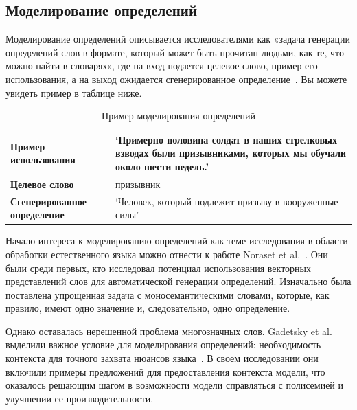 \documentclass[LI,VKR]{HSEUniversity}
\begin{document}
\subsection{Моделирование определений}

Моделирование определений описывается исследователями как «задача генерации определений слов в формате,
который может быть прочитан людьми, как те, что можно найти в словарях»,
где на вход подается целевое слово, пример его использования, а на выход
ожидается сгенерированное определение~\cite{DefinitionGenerationMainArticle}.
Вы можете увидеть пример в таблице ниже.

\begin{table}[H]
\centering
\caption{Пример моделирования определений}
\begin{tabular}{|l|p{8cm}|}
\hline
\textbf{Пример использования} & ‘Примерно половина солдат в наших стрелковых взводах были призывниками, которых мы обучали около шести недель.’ \\
\hline
\textbf{Целевое слово} & призывник \\
\hline
\textbf{Сгенерированное определение} & ‘Человек, который подлежит призыву в вооруженные силы’ \\
\hline
\end{tabular}
\end{table}

Начало интереса к моделированию определений как теме исследования
в области обработки естественного языка можно отнести
к работе Noraset et al.~\cite{noraset2016definition}.
Они были среди первых, кто исследовал потенциал использования векторных представлений слов
для автоматической генерации определений.
Изначально была поставлена упрощенная задача с моносемантическими словами,
которые, как правило, имеют одно значение и, следовательно, одно определение.

Однако оставалась нерешенной проблема многозначных слов.
Gadetsky et al. выделили важное условие для моделирования определений:
необходимость контекста для точного захвата нюансов языка~\cite{gadetsky-etal-2018-conditional}.
В своем исследовании они включили примеры предложений для предоставления контекста модели,
что оказалось решающим шагом в возможности модели справляться с полисемией и улучшении
ее производительности.
\end{document}
